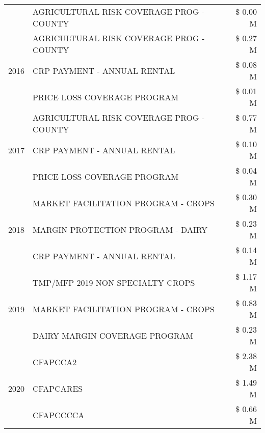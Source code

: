 \begin{tabular}{llr}
 & AGRICULTURAL RISK COVERAGE PROG - COUNTY & \$ 0.00 M \\
\cline{1-3}
\multirow[t]{3}{*}{2016} & AGRICULTURAL RISK COVERAGE PROG - COUNTY & \$ 0.27 M \\
 & CRP PAYMENT - ANNUAL RENTAL & \$ 0.08 M \\
 & PRICE LOSS COVERAGE PROGRAM & \$ 0.01 M \\
\cline{1-3}
\multirow[t]{3}{*}{2017} & AGRICULTURAL RISK COVERAGE PROG - COUNTY & \$ 0.77 M \\
 & CRP PAYMENT - ANNUAL RENTAL & \$ 0.10 M \\
 & PRICE LOSS COVERAGE PROGRAM & \$ 0.04 M \\
\cline{1-3}
\multirow[t]{3}{*}{2018} & MARKET FACILITATION PROGRAM - CROPS & \$ 0.30 M \\
 & MARGIN PROTECTION PROGRAM - DAIRY & \$ 0.23 M \\
 & CRP PAYMENT - ANNUAL RENTAL & \$ 0.14 M \\
\cline{1-3}
\multirow[t]{3}{*}{2019} & TMP/MFP 2019 NON SPECIALTY CROPS & \$ 1.17 M \\
 & MARKET FACILITATION PROGRAM - CROPS & \$ 0.83 M \\
 & DAIRY MARGIN COVERAGE PROGRAM & \$ 0.23 M \\
\cline{1-3}
\multirow[t]{3}{*}{2020} & CFAPCCA2 & \$ 2.38 M \\
 & CFAPCARES & \$ 1.49 M \\
 & CFAPCCCCA & \$ 0.66 M \\
\cline{1-3}
\bottomrule
\end{tabular}
